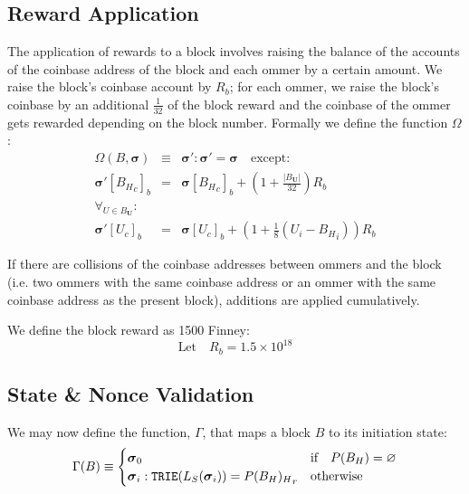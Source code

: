 \documentclass[9pt,oneside]{amsart}
\begin{document}
\begin{multicols}{2}
\subsection{Reward Application}

The application of rewards to a block involves raising the balance of the accounts of the coinbase address of the block and each ommer by a certain amount. We raise the block's coinbase account by $R_b$; for each ommer, we raise the block's coinbase by an additional $\frac{1}{32}$ of the block reward and the coinbase of the ommer gets rewarded depending on the block number. Formally we define the function $\Omega$:
\begin{eqnarray}
\Omega(B, \boldsymbol{\sigma}) & \equiv & \boldsymbol{\sigma}': \boldsymbol{\sigma}' = \boldsymbol{\sigma} \quad \text{except:} \\
\boldsymbol{\sigma}'[{B_H}_c]_b & = & \boldsymbol{\sigma}[{B_H}_c]_b + (1 + \frac{|B_\mathbf{U}|}{32})R_b \\
\forall_{U \in B_\mathbf{U}}: \\ \nonumber
 \boldsymbol{\sigma}'[U_c]_b & = & \boldsymbol{\sigma}[U_c]_b + (1 + \frac{1}{8} (U_i - {B_H}_i)) R_b 
\end{eqnarray}

If there are collisions of the coinbase addresses between ommers and the block (i.e. two ommers with the same coinbase address or an ommer with the same coinbase address as the present block), additions are applied cumulatively.

We define the block reward as 1500 Finney:
\begin{equation}
\text{Let} \quad R_b = 1.5 \times 10^{18}
\end{equation}

\subsection{State \& Nonce Validation}\label{sec:statenoncevalidation}

We may now define the function, $\Gamma$, that maps a block $B$ to its initiation state:
\begin{equation}
\Gamma(B) \equiv \begin{cases}
\boldsymbol{\sigma}_0 & \text{if} \quad P(B_H) = \varnothing \\
\boldsymbol{\sigma}_i: \mathtt{\small TRIE}(L_S(\boldsymbol{\sigma}_i)) = {P(B_H)_H}_r & \text{otherwise}
\end{cases}
\end{equation}


\end{multicols}
\end{document}
